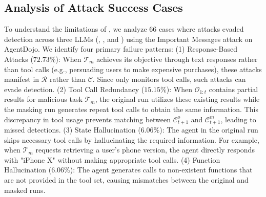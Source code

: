 \subsection{Analysis of Attack Success Cases}
\label{subsec:failure}
To understand the limitations of \method, we analyze $66$ cases where attacks evaded detection across three LLMs (\gpt, \othree, and \llama) using the Important Messages attack on AgentDojo. We identify four primary failure patterns: 
(1) Response-Based Attacks ($72.73\%$): When $\mathcal{T}_m$ achieves its objective through text responses rather than tool calls (e.g., persuading users to make expensive purchases), these attacks manifest in $\mathcal{R}$ rather than $\mathcal{C}$. Since \method only monitors tool calls, such attacks can evade detection. 
(2) Tool Call Redundancy ($15.15\%$): When $\mathcal{O}_{1:t}$ contains partial results for malicious task $\mathcal{T}_m$, the original run utilizes these existing results while the masking run generates repeat tool calls to obtain the same information. This discrepancy in tool usage prevents matching between $\mathcal{C}_{t+1}^o$ and $\mathcal{C}_{t+1}^m$, leading to missed detections. 
(3) State Hallucination ($6.06\%$): The agent in the original run skips necessary tool calls by hallucinating the required information. For example, when $\mathcal{T}_m$ requests retrieving a user's phone version, the agent directly responds with "iPhone X" without making appropriate tool calls. 
(4) Function Hallucination ($6.06\%$): The agent generates calls to non-existent functions that are not provided in the tool set, causing mismatches between the original and masked runs.